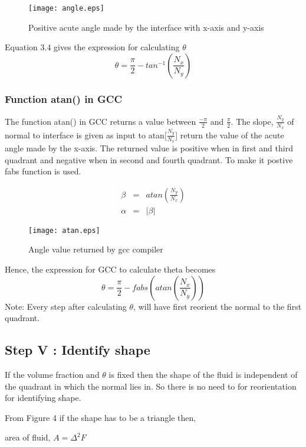  \begin{figure}[H]
 \centering
  \texttt{[image: angle.eps]}
  \caption[Angle definition of interface]{Positive acute angle made by the interface with x-axis and y-axis}
 \end{figure}

 Equation 3.4 gives the expression for calculating $\theta$
\begin{equation}
 \theta=\frac{\pi}{2}-tan^{-1}(\frac{N_x}{N_y})
 \end{equation}

\subsubsection{Function atan() in GCC}
The function atan() in GCC returns a value between $\frac{-\pi}{2}$ and $\frac{\pi}{2}$. The slope, $\frac{N_y}{N_x}$ of normal to interface
is given as input to atan$[\frac{N_y}{N_x}$] return the value of the acute angle made by the x-axis. 
The returned value is positive when in first and third quadrant and negative when in second and fourth quadrant. 
To make it postive fabs function is used.

\begin{eqnarray}
\beta &=& atan(\frac{N_y}{N_x}) \\
\alpha &=&\lvert\beta\lvert 
\end{eqnarray}

 \begin{figure}[H]
 \centering
  \texttt{[image: atan.eps]}
   \caption{Angle value returned by gcc compiler}
 \end{figure}

Hence, the expression for GCC to calculate theta becomes
\begin{equation}
 \theta=\frac{\pi}{2}-fabs(atan(\frac{N_x}{N_y}))
 \end{equation}
 Note: Every step after calculating $\theta$, will have first reorient the normal to the first quadrant.
\subsection{Step V : Identify shape}
If the volume fraction and $\theta$ is fixed then the shape of the fluid is independent of the quadrant in which the normal lies in. So there is no need to for reorientation for 
identifying shape.

From Figure 4 if the shape has to be a triangle
then,

area of fluid, $A=\Delta^2F$ \\ 

